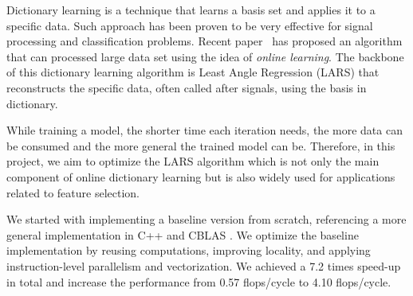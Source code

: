 
Dictionary learning is a technique that learns a basis set and applies it to a specific data.
Such approach has been proven to be very effective for signal processing and classification problems.
Recent paper~\cite{Mairal:2010} has proposed an algorithm that can processed large data set using the idea of \emph{online learning}.
The backbone of this dictionary learning algorithm is Least Angle Regression (LARS) that reconstructs the specific data, often called after signals, using the basis in dictionary.

While training a model, the shorter time each iteration needs, the more data can be consumed and the more general the trained model can be.
Therefore, in this project, we aim to optimize the LARS algorithm which is not only the main component of online dictionary learning but is also widely used for applications related to feature selection.

We started with implementing a baseline version from scratch, referencing a more general implementation in C++ and CBLAS \cite{larscpp}.
We optimize the baseline implementation by reusing computations, improving locality, and applying instruction-level parallelism and vectorization. 
We achieved a 7.2 times speed-up in total and increase the performance from 0.57 flops/cycle to 4.10 flops/cycle.




